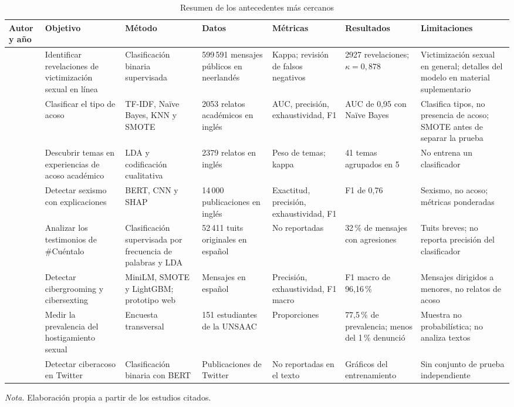 \begin{table}[H]
\begin{threeparttable}
\caption{Resumen de los antecedentes más cercanos}
\label{tab:antecedentes}
\singlespacing\scriptsize
\setlength{\tabcolsep}{3pt}
\renewcommand{\arraystretch}{1.25}
\begin{tabular}{@{}L{1.9cm} L{2.2cm} L{2.0cm} L{2.4cm} L{1.9cm} L{2.3cm} L{2.6cm}@{}}
\toprule
\textbf{Autor y año} & \textbf{Objetivo} & \textbf{Método} & \textbf{Datos} & \textbf{Métricas} & \textbf{Resultados} & \textbf{Limitaciones} \\
\midrule
\citet{gorissen2023} & Identificar revelaciones de victimización sexual en línea & Clasificación binaria supervisada & 599\,591 mensajes públicos en neerlandés & Kappa; revisión de falsos negativos & 2927 revelaciones; $\kappa = 0{,}878$ & Victimización sexual en general; detalles del modelo en material suplementario \\
\citet{wijaya2022} & Clasificar el tipo de acoso & TF-IDF, Naïve Bayes, KNN y SMOTE & 2053 relatos académicos en inglés & AUC, precisión, exhaustividad, F1 & AUC de 0,95 con Naïve Bayes & Clasifica tipos, no presencia de acoso; SMOTE antes de separar la prueba \\
\citet{karami2020} & Descubrir temas en experiencias de acoso académico & LDA y codificación cualitativa & 2379 relatos en inglés & Peso de temas; kappa & 41 temas agrupados en 5 & No entrena un clasificador \\
\citet{mohammadi2024} & Detectar sexismo con explicaciones & BERT, CNN y SHAP & 14\,000 publicaciones en inglés & Exactitud, precisión, exhaustividad, F1 & F1 de 0,76 & Sexismo, no acoso; métricas ponderadas \\
\citet{escobar2022} & Analizar los testimonios de \#Cuéntalo & Clasificación supervisada por frecuencia de palabras y LDA & 52\,411 tuits originales en español & No reportadas & 32\,\% de mensajes con agresiones & Tuits breves; no reporta precisión del clasificador \\
\citet{imbaquinga2025} & Detectar cibergrooming y cibersexting & MiniLM, SMOTE y LightGBM; prototipo web & Mensajes en español & Precisión, exhaustividad, F1 macro & F1 macro de 96,16\,\% & Mensajes dirigidos a menores, no relatos de acoso \\
\citet{gutierrez2022} & Medir la prevalencia del hostigamiento sexual & Encuesta transversal & 151 estudiantes de la UNSAAC & Proporciones & 77,5\,\% de prevalencia; menos del 1\,\% denunció & Muestra no probabilística; no analiza textos \\
\citet{aguirre2022} & Detectar ciberacoso en Twitter & Clasificación binaria con BERT & Publicaciones de Twitter & No reportadas en el texto & Gráficos del entrenamiento & Sin conjunto de prueba independiente \\
\bottomrule
\end{tabular}
\begin{tablenotes}[flushleft]
\scriptsize
\item \textit{Nota.} Elaboración propia a partir de los estudios citados.
\end{tablenotes}
\end{threeparttable}
\end{table}

